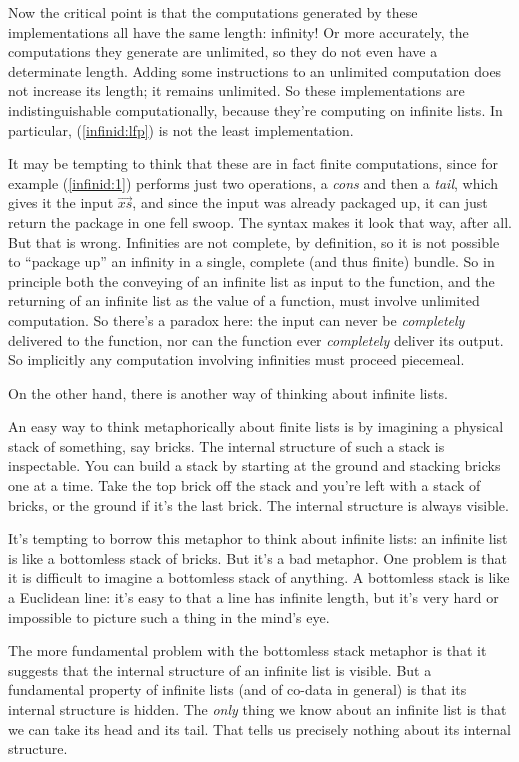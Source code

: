 Now the critical point is that the computations generated by these
implementations all have the same length: infinity! Or more
accurately, the computations they generate are unlimited, so they do
not even have a determinate length. Adding some instructions to an
unlimited computation does not increase its length; it remains
unlimited. So these implementations are indistinguishable
computationally, because they're computing on infinite lists. In
particular, (\ref{infinid:lfp}) is not the least implementation.

It may be tempting to think that these are in fact finite
computations, since for example (\ref{infinid:1}) performs just two
operations, a \textit{cons} and then a \textit{tail}, which gives it
the input \(\overrightarrow{xs}\), and since the input was already
packaged up, it can just return the package in one fell swoop. The
syntax makes it look that way, after all. But that is wrong.
Infinities are not complete, by definition, so it is not possible to
``package up'' an infinity in a single, complete (and thus finite)
bundle. So in principle both the conveying of an infinite list as
input to the function, and the returning of an infinite list as the
value of a function, must involve unlimited computation. So there's a
paradox here: the input can never be \textit{completely} delivered to
the function, nor can the function ever \textit{completely} deliver
its output. So implicitly any computation involving infinities must
proceed piecemeal.

On the other hand, there is another way of thinking about infinite
lists.

An easy way to think metaphorically about finite lists is by imagining
a physical stack of something, say bricks. The internal structure of
such a stack is inspectable. You can build a stack by starting at the
ground and stacking bricks one at a time. Take the top brick off the
stack and you're left with a stack of bricks, or the ground if it's the
last brick.  The internal structure is always visible.

It's tempting to borrow this metaphor to think about infinite lists:
an infinite list is like a bottomless stack of bricks. But it's a bad
metaphor. One problem is that it is difficult to imagine a bottomless
stack of anything. A bottomless stack is like a Euclidean line: it's
easy to  that a line has infinite length, but it's very hard
or impossible to picture such a thing in the mind's eye.

The more fundamental problem with the bottomless stack metaphor is
that it suggests that the internal structure of an infinite list is
visible. But a fundamental property of infinite lists (and of co-data
in general) is that its internal structure is hidden. The
\textit{only} thing we know about an infinite list is that we can take
its head and its tail. That tells us precisely nothing about its
internal structure.

